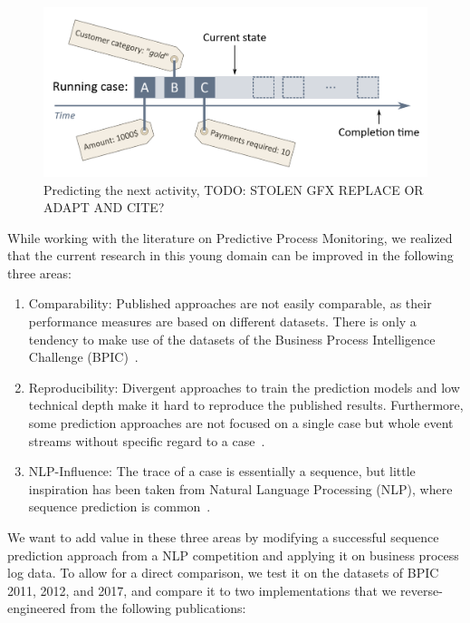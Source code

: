 \begin{figure}
    \centering
    \includegraphics[width=\textwidth]{gfx/next-activity.png}
    \caption{Predicting the next activity, TODO: STOLEN GFX REPLACE OR ADAPT AND CITE?}
    \label{fig:next-activity-prediction}
\end{figure}

While working with the literature on Predictive Process Monitoring, we realized that the current research in this young domain can be improved in the following three areas:

\begin{enumerate}
    \item Comparability: Published approaches are not easily comparable, as their performance measures are based on different datasets. There is only a tendency to make use of the datasets of the Business Process Intelligence Challenge (BPIC)~\cite{BPIC2011, BPIC2012, BPIC2017}.
    \item Reproducibility: Divergent approaches to train the prediction models and low technical depth make it hard to reproduce the published results. Furthermore, some prediction approaches are not focused on a single case but whole event streams without specific regard to a case~\cite{evermann2016, schoenig2018}.
    \item NLP-Influence: The trace of a case is essentially a sequence, but little inspiration has been taken from Natural Language Processing (NLP), where sequence prediction is common~\cite{shibata2016bipartite}.
\end{enumerate}

We want to add value in these three areas by modifying a successful sequence prediction approach from a NLP competition and applying it on business process log data. To allow for a direct comparison, we test it on the datasets of BPIC 2011, 2012, and 2017, and compare it to two implementations that we reverse-engineered from the following publications:

